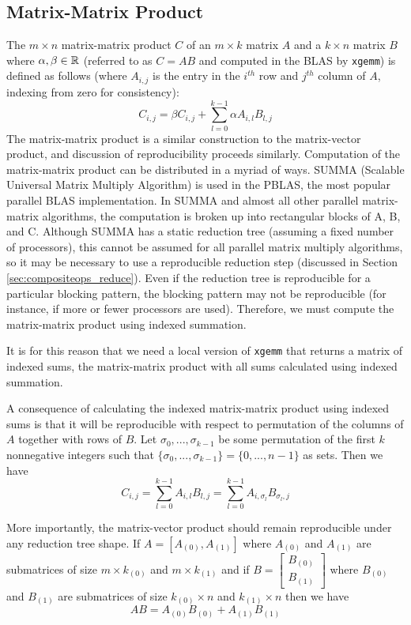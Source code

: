 \subsection{Matrix-Matrix Product}
  \label{sec:compositeops_gemm}
  The $m \times n$ matrix-matrix product $C$ of an $m \times k$ matrix $A$ and a $k \times n$ matrix $B$ where $\alpha, \beta \in \mathbb{R}$ (referred to as $C = AB$ and computed in the BLAS by \texttt{xgemm}) is defined as follows (where $A_{i, j}$ is the entry in the $i^{th}$ row and $j^{th}$ column of $A$, indexing from zero for consistency):
  \[
    C_{i, j} = \beta C_{i, j} + \sum\limits_{l = 0}^{k - 1} \alpha A_{i, l}B_{l, j}
  \]
  The matrix-matrix product is a similar construction to the matrix-vector product, and discussion of reproducibility proceeds similarly.
  Computation of the matrix-matrix product can be distributed in a myriad of ways. SUMMA (Scalable Universal Matrix Multiply Algorithm) \cite{SUMMA} is used in the PBLAS, the most popular parallel BLAS implementation. In SUMMA and almost all other parallel matrix-matrix algorithms, the computation is broken up into rectangular blocks of A, B, and C. Although SUMMA has a static reduction tree (assuming a fixed number of processors), this cannot be assumed for all parallel matrix multiply algorithms, so it may be necessary to use a reproducible reduction step (discussed in Section \ref{sec:compositeops_reduce}).
  Even if the reduction tree is reproducible for a particular blocking pattern, the blocking pattern may not be reproducible (for instance, if more or fewer processors are used). Therefore, we must compute the matrix-matrix product using indexed summation.

  It is for this reason that we need a local version of \texttt{xgemm} that returns a matrix of indexed sums, the matrix-matrix product with all sums calculated using indexed summation.

  A consequence of calculating the indexed matrix-matrix product using indexed sums is that it will be reproducible with respect to permutation of the columns of $A$ together with rows of $B$.
  Let $\sigma_0, ..., \sigma_{k - 1}$ be some permutation of the first $k$ nonnegative integers such that $\{\sigma_0, ..., \sigma_{k - 1}\} = \{0, ..., n - 1\}$ as sets. Then we have
  \[
    C_{i, j} = \sum\limits_{l = 0}^{k - 1} A_{i, l}B_{l, j} = \sum\limits_{l = 0}^{k - 1} A_{i, \sigma_l}B_{\sigma_l, j}
  \]

  More importantly, the matrix-vector product should remain reproducible under any reduction tree shape.
  If $A = [A_{(0)}, A_{(1)}]$ where $A_{(0)}$ and $A_{(1)}$ are submatrices of size $m \times k_{(0)}$ and $m \times k_{(1)}$ and if $B = \left[\begin{array}{c}B_{(0)}\\ B_{(1)}\end{array}\right]$ where $B_{(0)}$ and $B_{(1)}$ are submatrices of size $k_{(0)} \times n$ and $k_{(1)} \times n$ then we have 
  \[
    AB = A_{(0)}B_{(0)} + A_{(1)}B_{(1)}
  \]

